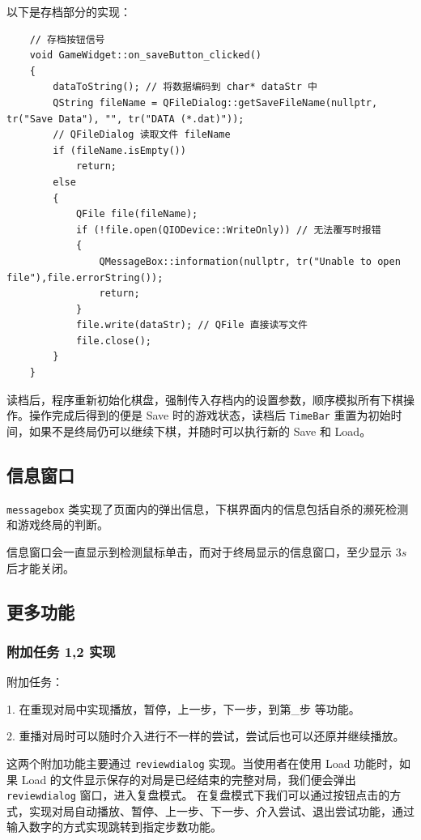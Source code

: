 \documentclass{noithesis}
\begin{document}
	以下是存档部分的实现：
	
	\begin{lstlisting}
	// 存档按钮信号
	void GameWidget::on_saveButton_clicked()
	{
		dataToString(); // 将数据编码到 char* dataStr 中
		QString fileName = QFileDialog::getSaveFileName(nullptr, tr("Save Data"), "", tr("DATA (*.dat)"));
		// QFileDialog 读取文件 fileName
		if (fileName.isEmpty())
			return;
		else
		{
			QFile file(fileName);
			if (!file.open(QIODevice::WriteOnly)) // 无法覆写时报错
			{
				QMessageBox::information(nullptr, tr("Unable to open file"),file.errorString());
				return;
			}
			file.write(dataStr); // QFile 直接读写文件
			file.close();
		}
	}
	\end{lstlisting}
	
	读档后，程序重新初始化棋盘，强制传入存档内的设置参数，顺序模拟所有下棋操作。操作完成后得到的便是 Save 时的游戏状态，读档后 \verb|TimeBar| 重置为初始时间，如果不是终局仍可以继续下棋，并随时可以执行新的 Save 和 Load。
	
	\subsection{信息窗口}
	
	\verb|messagebox| 类实现了页面内的弹出信息，下棋界面内的信息包括自杀的濒死检测和游戏终局的判断。
	
	信息窗口会一直显示到检测鼠标单击，而对于终局显示的信息窗口，至少显示 $3s$ 后才能关闭。
	
	\subsection{更多功能}

	\subsubsection{附加任务 1,2 实现}
	
	附加任务：
	
	1. 在重现对局中实现播放，暂停，上一步，下一步，到第\_步 等功能。
	
	2. 重播对局时可以随时介入进行不一样的尝试，尝试后也可以还原并继续播放。
	
	这两个附加功能主要通过 \verb|reviewdialog| 实现。当使用者在使用 Load 功能时，如果 Load 的文件显示保存的对局是已经结束的完整对局，我们便会弹出 \verb|reviewdialog| 窗口，进入复盘模式。
    在复盘模式下我们可以通过按钮点击的方式，实现对局自动播放、暂停、上一步、下一步、介入尝试、退出尝试功能，通过输入数字的方式实现跳转到指定步数功能。
  
\end{document}
